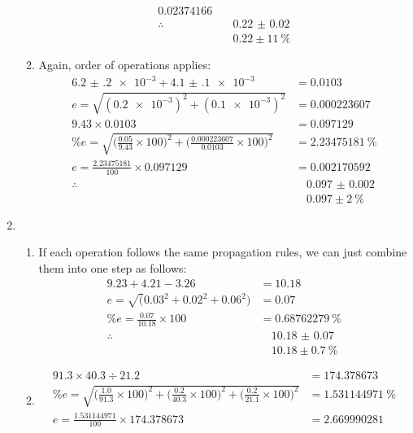 \documentclass{article}
\begin{document}
\begin{enumerate}[start=14]
\begin{enumerate}
\begin{align*}
				\num{0.02374166} \\
				\therefore &\quad \boxed{\num{0.22(2)}} \\
				&\quad \boxed{\num{0.22} \pm \SI{11}{\percent}}
			\end{align*}
		\item Again, order of operations applies:
			\begin{align*}
				\num{6.2(2)e-3} + \num{4.1(1)e-3} &= \num{0.0103} \\
				e = \sqrt{(\num{0.2e-3})^2 + (\num{0.1e-3})^2} &= \num{0.000223607} \\
				\num{9.43} \times \num{0.0103} &= \num{0.097129} \\
				\%e = \sqrt{\bigg(\frac{0.05}{9.43}\times 100 \bigg)^2
					+ \bigg(\frac{0.000223607}{0.0103}\times 100 \bigg)^2
				} &= \SI{2.23475181}{\percent} \\
				e = \frac{\num{2.23475181}}{100} \times \num{0.097129} &=
				\num{0.002170592} \\
				\therefore &\quad \boxed{\num{0.097(2)}} \\
				&\quad \boxed{\num{0.097} \pm \SI{2}{\percent}}
			\end{align*}
		\end{enumerate}
	\item \begin{enumerate}
		\item If each operation follows the same propagation rules, we
			can just combine them into one step as follows:
			\begin{align*}
				9.23 + 4.21 - 3.26 &= 10.18 \\
				e = \sqrt(0.03^2 + 0.02^2 + 0.06^2) &= 0.07 \\
				\%e = \frac{0.07}{10.18} \times 100 &= \SI{0.68762279}{\percent} \\
				\therefore &\quad \boxed{\num{10.18(7)}} \\
				&\quad \boxed{10.18 \pm \SI{0.7}{\percent}}
			\end{align*}
		\item \begin{align*}
				91.3 \times 40.3 \div 21.2 &= \num{174.378673} \\
				\%e = \sqrt{\bigg(\frac{1.0}{91.3}\times 100 \bigg)^2
					+ \bigg(\frac{0.2}{40.3}\times 100 \bigg)^2
					+ \bigg(\frac{0.2}{21.1}\times 100 \bigg)^2
				} &= \SI{1.531144971}{\percent} \\
				e = \frac{\num{1.531144971}}{100} \times \num{174.378673} &=
				\num{2.669990281} \\

\end{align*}
\end{enumerate}
\end{enumerate}
\end{document}
